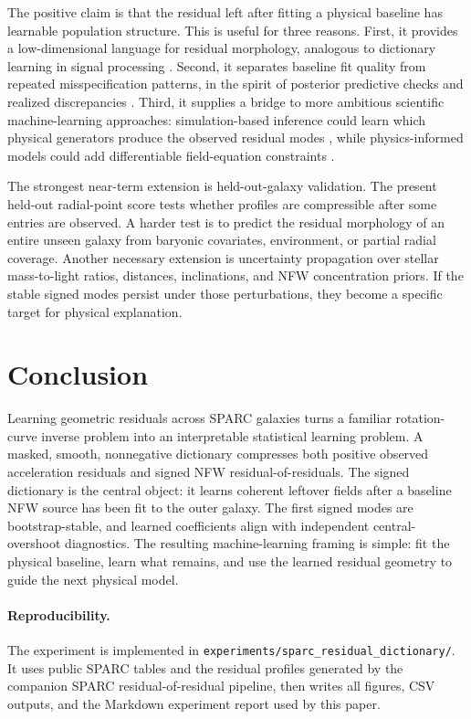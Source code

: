 \documentclass[10pt,twocolumn]{article}
\begin{document}
The positive claim is that the residual left after fitting a physical baseline
has learnable population structure. This is useful for three reasons.
First, it provides a low-dimensional language for residual morphology, analogous
to dictionary learning in signal processing \citep{Olshausen1996,Aharon2006}.
Second, it separates baseline fit quality from repeated misspecification
patterns, in the spirit of posterior predictive checks and realized
discrepancies \citep{Gelman1996}. Third, it supplies a bridge to more ambitious
scientific machine-learning approaches: simulation-based inference could learn
which physical generators produce the observed residual modes
\citep{Cranmer2020}, while physics-informed models could add differentiable
field-equation constraints \citep{Raissi2019}.

The strongest near-term extension is held-out-galaxy validation. The present
held-out radial-point score tests whether profiles are compressible after some
entries are observed. A harder test is to predict the residual morphology of an
entire unseen galaxy from baryonic covariates, environment, or partial radial
coverage. Another necessary extension is uncertainty propagation over stellar
mass-to-light ratios, distances, inclinations, and NFW concentration priors.
If the stable signed modes persist under those perturbations, they become a
specific target for physical explanation.

\section{Conclusion}

Learning geometric residuals across SPARC galaxies turns a familiar
rotation-curve inverse problem into an interpretable statistical learning
problem. A masked, smooth, nonnegative dictionary compresses both positive
observed acceleration residuals and signed NFW residual-of-residuals. The
signed dictionary is the central object: it learns coherent leftover fields
after a baseline NFW source has been fit to the outer galaxy. The first signed
modes are bootstrap-stable, and learned coefficients align with independent
central-overshoot diagnostics. The resulting machine-learning framing is simple: fit the
physical baseline, learn what remains, and use the learned residual geometry to
guide the next physical model.

\paragraph{Reproducibility.}
The experiment is implemented in
\texttt{experiments/sparc\_residual\_dictionary/}. It uses public SPARC
tables and the residual profiles generated by the companion SPARC
residual-of-residual pipeline, then writes all figures, CSV outputs, and the
Markdown experiment report used by this paper.

\small

\end{document}
